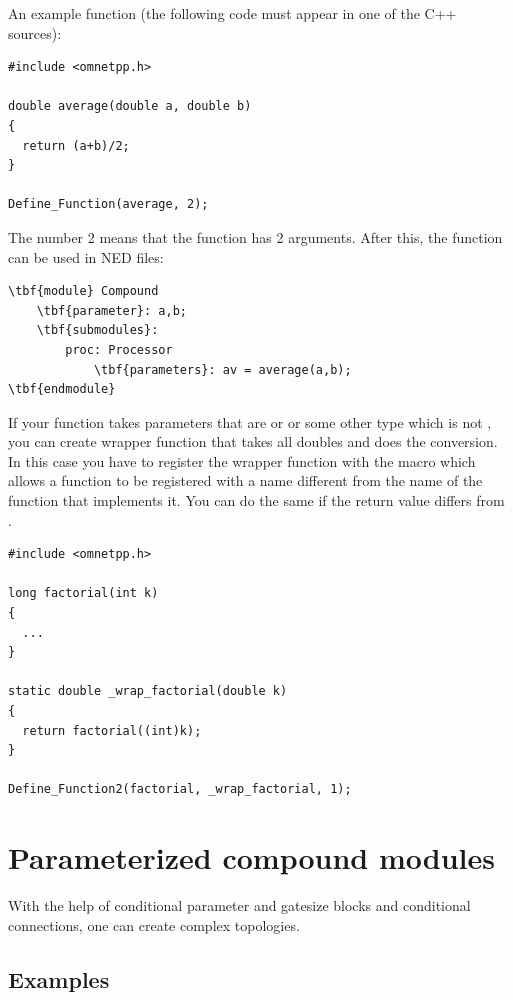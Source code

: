 An example function (the following code must appear in one of the C++
sources):


\begin{verbatim}
#include <omnetpp.h>

double average(double a, double b)
{
  return (a+b)/2;
}

Define_Function(average, 2);
\end{verbatim}


The number 2 means that the  function has 2
arguments.  After this, the  function can be used in
NED files:


\begin{Verbatim}[commandchars=\\\{\}]
\tbf{module} Compound
    \tbf{parameter}: a,b;
    \tbf{submodules}:
        proc: Processor
            \tbf{parameters}: av = average(a,b);
\tbf{endmodule}
\end{Verbatim}


If your function takes parameters that are  or  or
some other type which is not , you can create wrapper function
that takes all doubles and does the conversion. In this case you have
to register the wrapper function with the  macro
which allows a function to be registered with a name different from the
name of the function that implements it. You can do the same
if the return value differs from .

\begin{verbatim}
#include <omnetpp.h>

long factorial(int k)
{
  ...
}

static double _wrap_factorial(double k)
{
  return factorial((int)k);
}

Define_Function2(factorial, _wrap_factorial, 1);
\end{verbatim}




\section{Parameterized compound modules}


With the help of conditional parameter and gatesize blocks and
conditional connections, one can
create complex topologies.


\subsection{Examples}

